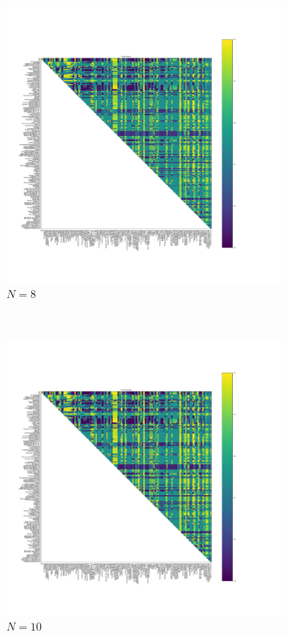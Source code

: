 \documentclass{article}
\begin{document}
\begin{figure}[!hbtp]
    \begin{subfigure}[t]{.3\textwidth}
        \centering
        \includegraphics[width=.8\textwidth]{../img/fixation_heatmap_8_noise.pdf}
        \caption{\(N=8\)}
    \end{subfigure}%
    ~
    \begin{subfigure}[t]{.3\textwidth}
        \centering
        \includegraphics[width=.8\textwidth]{../img/fixation_heatmap_10_noise.pdf}
        \caption{\(N=10\)}
    \end{subfigure}%
    ~
    \begin{subfigure}[t]{.3\textwidth}

\end{subfigure}
\end{figure}
\end{document}

